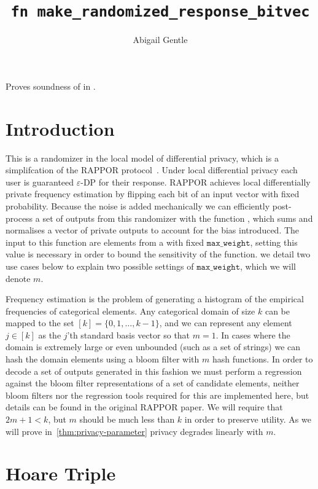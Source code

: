 \documentclass{article}
\title{\texttt{fn make\_randomized\_response\_bitvec}}
\author{Abigail Gentle}
\begin{document}
 
 
\maketitle 
 
Proves soundness of  in . 
 
\section{Introduction} 
This is a randomizer in the local model of differential privacy, which is a simplifcation of the RAPPOR protocol~\cite{rappor}. Under local differential privacy each user is guaranteed $\varepsilon$-DP for their response. RAPPOR achieves local differentially private frequency estimation by flipping each bit of an input vector with fixed probability. Because the noise is added mechanically we can efficiently post-process a set of outputs from this randomizer with the function , which sums and normalises a vector of private outputs to account for the bias introduced. The input to this function are elements from a  with fixed $\texttt{max\_weight}$, setting this value is necessary in order to bound the sensitivity of the function. we detail two use cases below to explain two possible settings of $\texttt{max\_weight}$, which we will denote $m$. 
 
Frequency estimation is the problem of generating a histogram of the empirical frequencies of categorical elements. Any categorical domain of size $k$ can be mapped to the set $[k]=\{0,1,\ldots,k-1\}$, and we can represent any element $j\in[k]$ as the $j$'th standard basis vector so that $m=1$. In cases where the domain is extremely large or even unbounded (such as a set of strings) we can hash the domain elements using a bloom filter with $m$ hash functions. In order to decode a set of outputs generated in this fashion we must perform a regression against the bloom filter representations of a set of candidate elements, neither bloom filters nor the regression tools required for this are implemented here, but details can be found in the original RAPPOR paper. We will require that $2m+1<k$, but $m$ should be much less than $k$ in order to preserve utility. As we will prove in~\ref{thm:privacy-parameter} privacy degrades linearly with $m$.  
 
\section{Hoare Triple} 
\end{document}
